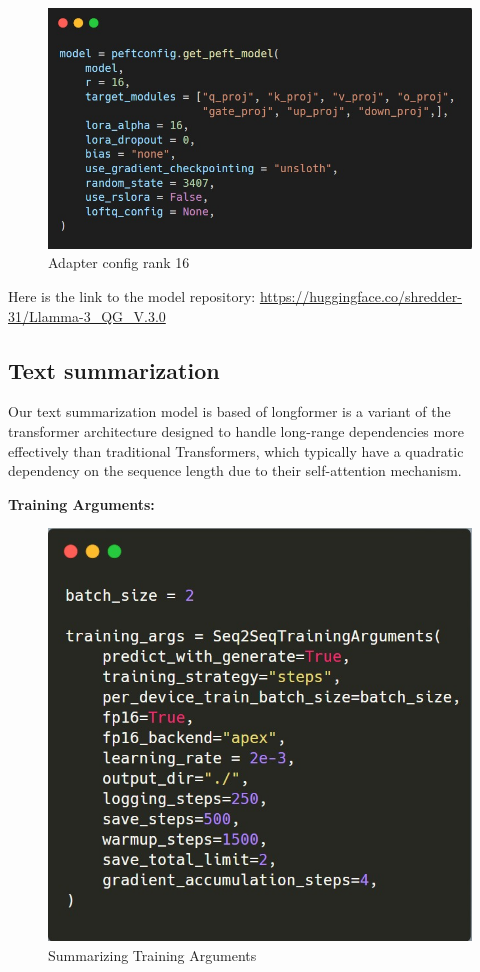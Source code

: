 \begin{figure}[h!]
	\centering
	\includegraphics[scale=0.6]{figures/Adapter config rank 16.jpeg}
	\caption{ Adapter config rank 16 }
\end{figure}

\hfill \break
Here is the link to the model repository: \url{https://huggingface.co/shredder-31/Llamma-3_QG_V.3.0}

\newpage
\subsection{Text summarization }

Our text summarization model is based of \cite{beltagy2020longformer} longformer is a variant of the transformer architecture designed to handle long-range dependencies more effectively than traditional Transformers, which typically have a quadratic dependency on the sequence length due to their self-attention mechanism. 

\hfill \break
\hfill \break
\textbf{Training Arguments:}


\begin{figure}[h!]
	\centering
	\includegraphics[scale=0.6]{figures/SummarizationTraining Arguments.png}
	\caption{ Summarizing Training Arguments }
\end{figure}


